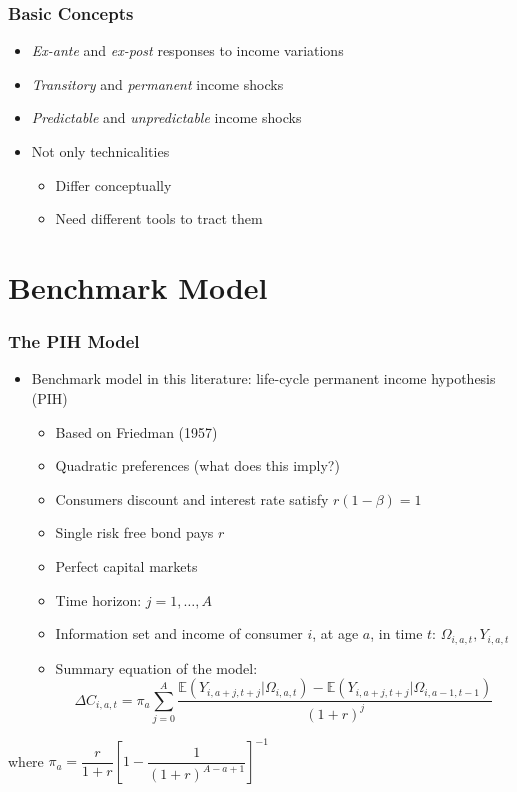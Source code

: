 \begin{frame}
	\frametitle{Basic Concepts}
\begin{itemize}
	\item \textit{Ex-ante} and \textit{ex-post} responses to income variations
	\item \textit{Transitory} and \textit{permanent} income shocks
	\item \textit{Predictable} and \textit{unpredictable} income shocks
	\item Not only technicalities
		\begin{itemize}
			\item Differ conceptually
			\item Need different tools to tract them
		\end{itemize}
\end{itemize}
\end{frame}

\section{Benchmark Model}

\begin{frame}
	\frametitle{The PIH Model}
		\begin{itemize}
			\item Benchmark model in this literature: life-cycle permanent income hypothesis (PIH)
			\begin{itemize}
				\item Based on Friedman (1957)
				\item Quadratic preferences (what does this imply?)
				\item Consumers discount and interest rate satisfy $r(1 - \beta) = 1$
				\item Single risk free bond pays $r$
				\item Perfect capital markets
				\item Time horizon: $j = 1, \ldots, A$
				\item Information set and income of consumer $i$, at age $a$, in time $t$: $\Omega_{i,a,t}, Y_{i,a,t}$
				\item Summary equation of the model:
				\begin{equation}
				\Delta C_{i,a,t} = \pi_{a} \sum \limits _{j=0} ^{A} \frac{\mathbb{E}\left( Y_{i,a+j,t+j}| \Omega_{i,a,t}\right) - \mathbb{E}\left( Y_{i,a+j,t+j}| \Omega_{i,a-1,t-1}\right)}{(1+r)^j} \nonumber
				\end{equation}
			\end{itemize}
		\end{itemize}
\noindent where $\pi_{a}=\dfrac{r}{1+r} \left[ 1-\dfrac{1}{(1+r)^{A-a+1}} \right]^{-1}$
\end{frame}

